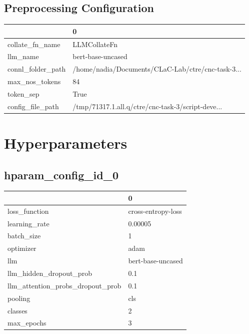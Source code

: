 \documentclass{article}
\begin{document}
\subsection{Preprocessing Configuration}
\begin{tabular}{ll}
\toprule
{} &                                                  0 \\
\midrule
collate\_fn\_name   &                                       LLMCollateFn \\
llm\_name          &                                  bert-base-uncased \\
connl\_folder\_path &  /home/nadia/Documents/CLaC-Lab/ctre/cnc-task-3... \\
max\_nos\_tokens    &                                                 84 \\
token\_sep         &                                               True \\
config\_file\_path  &  /tmp/71317.1.all.q/ctre/cnc-task-3/script-deve... \\
\bottomrule
\end{tabular}

\section{Hyperparameters}
\subsection{hparam\_config\_id\_0}
\begin{tabular}{ll}
\toprule
{} &                   0 \\
\midrule
loss\_function                    &  cross-entropy-loss \\
learning\_rate                    &             0.00005 \\
batch\_size                       &                   1 \\
optimizer                        &                adam \\
llm                              &   bert-base-uncased \\
llm\_hidden\_dropout\_prob          &                 0.1 \\
llm\_attention\_probs\_dropout\_prob &                 0.1 \\
pooling                          &                 cls \\
classes                          &                   2 \\
max\_epochs                       &                   3 \\
\bottomrule
\end{tabular}
\end{document}
